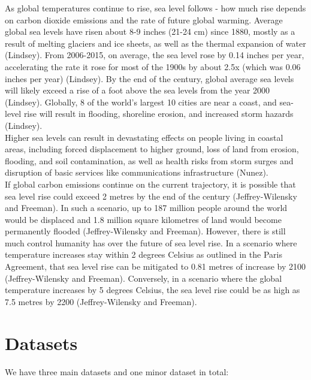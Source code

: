 \documentclass[fontsize=11pt]{article}
\begin{document}
As global temperatures continue to rise, sea level follows - how much rise depends on carbon dioxide emissions and the rate of future global warming. Average global sea levels have risen about 8-9 inches (21-24 cm) since 1880, mostly as a result of melting glaciers and ice sheets, as well as the thermal expansion of water (Lindsey). From 2006-2015, on average, the sea level rose by 0.14 inches per year, accelerating the rate it rose for most of the 1900s by about 2.5x (which was 0.06 inches per year) (Lindsey). By the end of the century, global average sea levels will likely exceed a rise of a foot above the sea levels from the year 2000 (Lindsey). Globally, 8 of the world’s largest 10 cities are near a coast, and sea-level rise will result in flooding, shoreline erosion, and increased storm hazards (Lindsey).\\

Higher sea levels can result in devastating effects on people living in coastal areas, including forced displacement to higher ground, loss of land from erosion, flooding, and soil contamination, as well as health risks from storm surges and disruption of basic services like communications infrastructure (Nunez).\\ 

If global carbon emissions continue on the current trajectory, it is possible that sea level rise could exceed 2 metres by the end of the century (Jeffrey-Wilensky and Freeman). In such a scenario, up to 187 million people around the world would be displaced and 1.8 million square kilometres of land would become permanently flooded (Jeffrey-Wilensky and Freeman). However, there is still much control humanity has over the future of sea level rise. In a scenario where temperature increases stay within 2 degrees Celsius as outlined in the Paris Agreement, that sea level rise can be mitigated to 0.81 metres of increase by 2100 (Jeffrey-Wilensky and Freeman). Conversely, in a scenario where the global temperature increases by 5 degrees Celsius, the sea level rise could be as high as 7.5 metres by 2200 (Jeffrey-Wilensky and Freeman).



\section*{Datasets}

We have three main datasets and one minor dataset in total:
\end{document}
